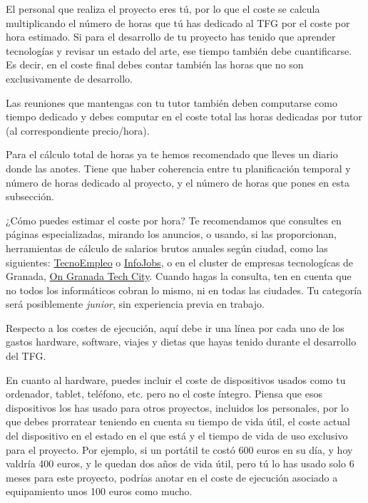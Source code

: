 El personal que realiza el proyecto eres tú, por lo que el coste se calcula multiplicando el número de horas que tú has dedicado al TFG por el coste por hora estimado. Si para el desarrollo de tu proyecto has tenido que aprender tecnologías y revisar un estado del arte, ese tiempo también debe cuantificarse. Es decir, en el coste final debes contar también las horas que no son exclusivamente de desarrollo. 

Las reuniones que mantengas con tu tutor también deben computarse como tiempo dedicado y debes computar en el coste total las horas dedicadas por tutor (al correspondiente precio/hora).

Para el cálculo total de horas ya te hemos recomendado que lleves un diario donde las anotes. Tiene que haber coherencia entre tu planificación temporal y número de horas dedicado al proyecto, y el número de horas que pones en esta subsección.

¿Cómo puedes estimar el coste por hora? Te recomendamos que consultes en páginas especializadas, mirando los anuncios, o usando, si las proporcionan, herramientas de cálculo de salarios brutos anuales según ciudad, como las siguientes: \href{https://www.tecnoempleo.com/ofertas-trabajo/}{TecnoEmpleo} o \href{https://www.tecnoempleo.com/ofertas-trabajo/}{InfoJobs}, o en el cluster de empresas tecnologícas de Granada, \href{https://www.ontechinnovation.com/bolsa-de-trabajo/}{On Granada Tech City}. Cuando hagas la consulta, ten en cuenta que no todos los informáticos cobran lo mismo, ni en todas las ciudades. Tu categoría será posiblemente \textit{junior}, sin experiencia previa en trabajo. 

Respecto a los costes de ejecución, aquí debe ir una línea por cada uno de los gastos hardware, software, viajes y dietas que hayas tenido durante el desarrollo del TFG. 

En cuanto al hardware, puedes incluir el coste de dispositivos usados como tu ordenador, tablet, teléfono, etc. pero no el coste íntegro. Piensa que esos dispositivos los has usado para otros proyectos, incluidos los personales, por lo que debes prorratear teniendo en cuenta su tiempo de vida útil, el coste actual del dispositivo en el estado en el que está y el tiempo de vida de uso exclusivo para el proyecto. Por ejemplo, si un portátil te costó 600 euros en su día, y hoy valdría 400 euros, y le quedan dos años de vida útil, pero tú lo has usado solo 6 meses para este proyecto, podrías anotar en el coste de ejecución asociado a equipamiento unos 100 euros como mucho.  

